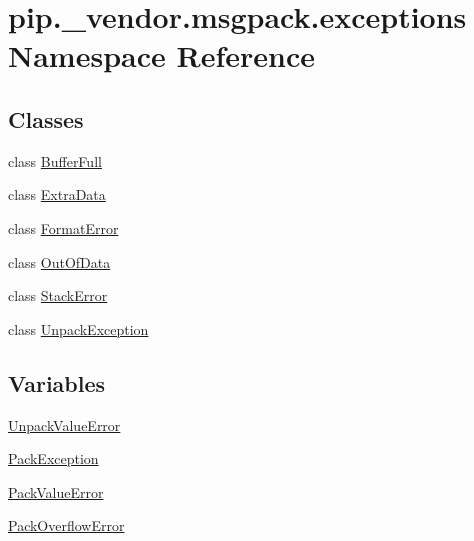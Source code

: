 \hypertarget{namespacepip_1_1__vendor_1_1msgpack_1_1exceptions}{}\section{pip.\+\_\+vendor.\+msgpack.\+exceptions Namespace Reference}
\label{namespacepip_1_1__vendor_1_1msgpack_1_1exceptions}
\subsection*{Classes}
\begin{DoxyCompactItemize}
\item 
class \hyperlink{classpip_1_1__vendor_1_1msgpack_1_1exceptions_1_1BufferFull}{Buffer\+Full}
\item 
class \hyperlink{classpip_1_1__vendor_1_1msgpack_1_1exceptions_1_1ExtraData}{Extra\+Data}
\item 
class \hyperlink{classpip_1_1__vendor_1_1msgpack_1_1exceptions_1_1FormatError}{Format\+Error}
\item 
class \hyperlink{classpip_1_1__vendor_1_1msgpack_1_1exceptions_1_1OutOfData}{Out\+Of\+Data}
\item 
class \hyperlink{classpip_1_1__vendor_1_1msgpack_1_1exceptions_1_1StackError}{Stack\+Error}
\item 
class \hyperlink{classpip_1_1__vendor_1_1msgpack_1_1exceptions_1_1UnpackException}{Unpack\+Exception}
\end{DoxyCompactItemize}
\subsection*{Variables}
\begin{DoxyCompactItemize}
\item 
\hyperlink{namespacepip_1_1__vendor_1_1msgpack_1_1exceptions_a971dee7df33aa53309097bbf144a31ec}{Unpack\+Value\+Error}
\item 
\hyperlink{namespacepip_1_1__vendor_1_1msgpack_1_1exceptions_abea6cabb400aff981e6f1349ea17121b}{Pack\+Exception}
\item 
\hyperlink{namespacepip_1_1__vendor_1_1msgpack_1_1exceptions_acc4902375cd9c73df106dbf5b94222f2}{Pack\+Value\+Error}
\item 
\hyperlink{namespacepip_1_1__vendor_1_1msgpack_1_1exceptions_aa4a59df8783078deafd748026c537eba}{Pack\+Overflow\+Error}
\end{DoxyCompactItemize}


